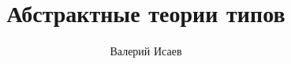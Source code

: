 \documentclass{amsart}
\theoremstyle{definition}
\theoremstyle{remark}
\numberwithin{figure}{section}
\begin{document}
\title{Абстрактные теории типов}

\author{Валерий Исаев}


\maketitle

\begin{comment}
\section{Обобщенные существенно алгебраические теории}

Для определения абстрактных теорий типов нам понадобится формализм для описания алгебраических теорий.
Существует, по крайней мере, два таких формализма.
Первый носит имя существенно алгебраических теорий.
Его синтаксическое представление было описано в \cite{LPC}.
Другой вариант -- это обобщенные алгебраические теории, определенные Картмеллом (см. \cite{GAT}).
Эти представления эквивалентны в том смысле, что они имеют один и тот же класс алгебр.
Категория является алгеброй $\lambda$-арной существенно алгебраической теории тогда и только тогда, когда она является локально $\lambda$-представимой (см. \cite{LPC, EAT}).

Мы введем новый формализм, который отличается от формализма существенно алгребраических теорий тем, что его синтаксис приближен к синтаксису теорий типов,
а от формализма обобщенных алгебраических теорий он отличается тем, что предоставляет более гибкий синтаксис, что позволяет описать наиболее общий класс теорий типов.
В этом разделе мы опишем этот формализм, и докажем, что алгебры таких теорий все еще являются локально представимыми.

\subsection{Описание синтаксиса}


\end{comment}
\end{document}
